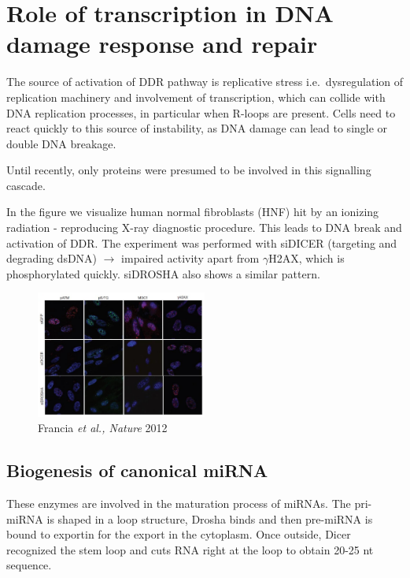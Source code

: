 \graphicspath{{chapters/_resources/}}

\chapter{Role of transcription in DNA damage response and repair}

The source of activation of DDR pathway is replicative stress i.e.~dysregulation of replication machinery and involvement of transcription, which can collide with DNA replication processes, in particular when R-loops are present. Cells need to react quickly to this source of instability, as DNA damage can lead to single or double DNA breakage.

Until recently, only proteins were presumed to be involved in this signalling cascade.

In the figure we visualize human normal fibroblasts (HNF) hit by an ionizing radiation - reproducing X-ray diagnostic procedure. This leads to DNA break and activation of DDR. The experiment was performed with siDICER (targeting and degrading dsDNA) $\rightarrow$ impaired activity apart from \(\gamma\)H2AX, which is phosphorylated quickly. siDROSHA also shows a similar pattern.

\begin{figure}
\centering
\includegraphics[width=0.5\textwidth]{Screen_Shot_2022-12-07_at_08-58-00.png}
\caption{Francia \emph{et al., Nature} 2012}
\end{figure}

\hypertarget{biogenesis-of-canonical-mirna}{%
\section{Biogenesis of canonical miRNA}\label{biogenesis-of-canonical-mirna}}

These enzymes are involved in the maturation process of miRNAs. The pri-miRNA is shaped in a loop structure, Drosha binds and then pre-miRNA is bound to exportin for the export in the cytoplasm. Once outside, Dicer recognized the stem loop and cuts RNA right at the loop to obtain 20-25 nt sequence.

